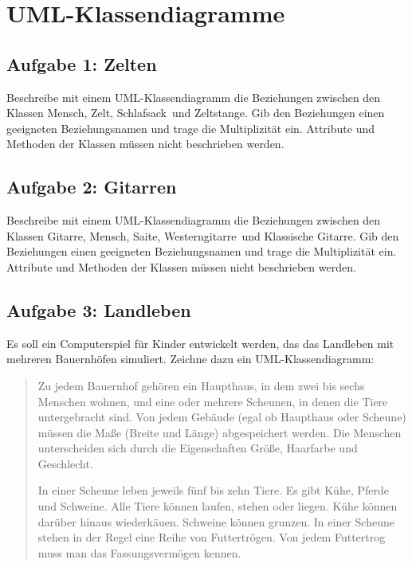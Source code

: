 \section{UML-Klassendiagramme}

\subsection{Aufgabe 1: Zelten}

Beschreibe mit einem UML-Klassendiagramm die Beziehungen zwischen den Klassen
\glqq Mensch\grqq , \glqq Zelt\grqq , \glqq Schlafsack\grqq\ und
\glqq Zeltstange\grqq . Gib den Beziehungen einen geeigneten Beziehungsnamen und
trage die Multiplizität ein. Attribute und Methoden der Klassen müssen nicht
beschrieben werden.

\subsection{Aufgabe 2: Gitarren}

Beschreibe mit einem UML-Klassendiagramm die Beziehungen zwischen den Klassen
\glqq Gitarre\grqq , \glqq Mensch\grqq , \glqq Saite\grqq , \glqq
Westerngitarre\grqq\ und \glqq Klassische Gitarre\grqq . Gib den Beziehungen
einen geeigneten Beziehungsnamen und trage die Multiplizität ein. Attribute und
Methoden der Klassen müssen nicht beschrieben werden.

\subsection{Aufgabe 3: Landleben}

Es soll ein Computerspiel für Kinder entwickelt werden, das das Landleben mit
mehreren Bauernhöfen simuliert. Zeichne dazu ein UML-Klassendiagramm:

\begin{quotation}
\noindent
Zu jedem Bauernhof gehören ein Haupthaus, in dem zwei bis sechs Menschen wohnen,
und eine oder mehrere Scheunen, in denen die Tiere untergebracht sind. Von jedem
Gebäude (egal ob Haupthaus oder Scheune) müssen die Maße (Breite und Länge)
abgespeichert werden. Die Menschen unterscheiden sich durch die Eigenschaften
Größe, Haarfarbe und Geschlecht.

\noindent
In einer Scheune leben jeweils fünf bis zehn Tiere. Es gibt Kühe, Pferde und
Schweine. Alle Tiere können laufen, stehen oder liegen. Kühe können darüber
hinaus wiederkäuen. Schweine können grunzen. In einer Scheune stehen in der
Regel eine Reihe von Futtertrögen. Von jedem Futtertrog muss man das
Fassungsvermögen kennen.
\end{quotation}
